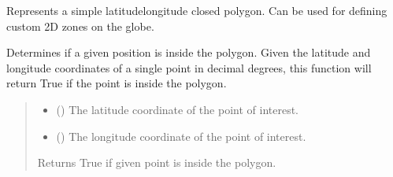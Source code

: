\documentclass[letterpaper,10pt,english]{sphinxmanual}
\begin{document}
\begin{fulllineitems}
\label{\detokenize{modules/gps/zones:qnav.gps.zones.Polygon}}
\pysigstartsignatures
{}
\pysigstopsignatures
\sphinxAtStartPar
Represents a simple latitude\sphinxhyphen{}longitude closed polygon.
Can be used for defining custom 2D zones on the globe.

\begin{fulllineitems}
\label{\detokenize{modules/gps/zones:qnav.gps.zones.Polygon.is_point_inside}}
\pysigstartsignatures
{}
\pysigstopsignatures
\sphinxAtStartPar
Determines if a given position is inside the polygon.
Given the latitude and longitude coordinates of a single point in
decimal degrees, this function will return True if the point is
inside the polygon.
\begin{quote}\begin{description}
\begin{itemize}
\item {} 
\sphinxAtStartPar
{} () \textendash{} The latitude coordinate of the point of interest.

\item {} 
\sphinxAtStartPar
{} () \textendash{} The longitude coordinate of the point of interest.

\end{itemize}

\sphinxAtStartPar
Returns True if given point is inside the polygon.


\end{description}
\end{quote}
\end{fulllineitems}
\end{fulllineitems}
\end{document}
